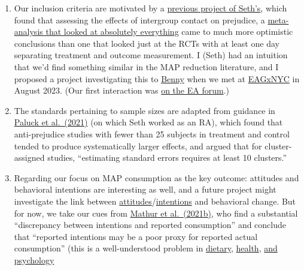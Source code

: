 \documentclass[
  letterpaper,
  DIV=11,
  numbers=noendperiod]{scrartcl}
\begin{document}
\begin{enumerate}
\def\labelenumi{\arabic{enumi}.}
\item
  Our inclusion criteria are motivated by a
  \href{https://doi.org/10.1017/bpp.2018.25}{previous project of
  Seth's}, which found that assessing the effects of intergroup contact
  on prejudice, a
  \href{https://psycnet.apa.org/record/2006-07099-004}{meta-analysis
  that looked at absolutely everything} came to much more optimistic
  conclusions than one that looked just at the RCTs with at least one
  day separating treatment and outcome measurement. I (Seth) had an
  intuition that we'd find something similar in the MAP reduction
  literature, and I proposed a project investigating this to
  \href{https://forum.effectivealtruism.org/users/benny-smith?from=post_header}{Benny}
  when we met at
  \href{https://www.effectivealtruism.org/ea-global/events/eagxnyc}{EAGxNYC}
  in August 2023. (Our first interaction was
  \href{https://forum.effectivealtruism.org/posts/MWkG4F86p4pyE3Sx9/is-stirring-up-anger-good-for-vegan-outreach?commentId=hC2BnuBTWFuBispCz}{on
  the EA forum}.)
\item
  The standards pertaining to sample sizes are adapted from guidance in
  \href{https://www.annualreviews.org/doi/abs/10.1146/annurev-psych-071620-030619}{Paluck
  et al.~(2021)} (on which Seth worked as an RA), which found that
  anti-prejudice studies with fewer than 25 subjects in treatment and
  control tended to produce systematically larger effects, and argued
  that for cluster-assigned studies, ``estimating standard errors
  requires at least 10 clusters.''
\item
  Regarding our focus on MAP consumption as the key outcome: attitudes
  and behavioral intentions are interesting as well, and a future
  project might investigate the link between
  \href{https://jacyanthis.com/Testing_the_Effectiveness.pdf}{attitudes}/\href{https://pubmed.ncbi.nlm.nih.gov/21816186/}{intentions}
  and behavioral change. But for now, we take our cues from
  \href{https://www.mdpi.com/2072-6643/13/12/4555}{Mathur et
  al.~(2021b)}, who find a substantial ``discrepancy between intentions
  and reported consumption'' and conclude that ``reported intentions may
  be a poor proxy for reported actual consumption'' (this is a
  well-understood problem in
  \href{https://pubmed.ncbi.nlm.nih.gov/7635601/}{dietary},
  \href{https://www.ncbi.nlm.nih.gov/pmc/articles/PMC6125069/}{health},
  \href{https://www.sciencedirect.com/science/article/abs/pii/S0148296322003848}{and}
  \href{https://www.frontiersin.org/articles/10.3389/fpsyg.2022.923464/full}{psychology}

\end{enumerate}
\end{document}
